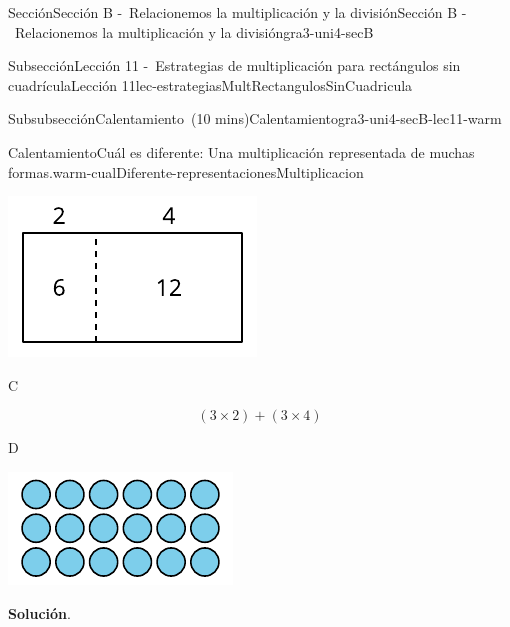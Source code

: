 \documentclass[oneside,10pt,]{article}
\newcommand{\blocktitlefont}{\relax}
\begin{document}
\begin{sectionptx}{Sección}{Sección B -~Relacionemos la multiplicación y la división}{}{Sección B -~Relacionemos la multiplicación y la división}{}{}{gra3-uni4-secB}
\begin{subsectionptx}{Subsección}{Lección 11 -~Estrategias de multiplicación para rectángulos sin cuadrícula}{}{Lección 11}{}{}{lec-estrategiasMultRectangulosSinCuadricula}
\begin{subsubsectionptx}{Subsubsección}{Calentamiento~(10 mins)}{}{Calentamiento}{}{}{gra3-uni4-secB-lec11-warm}
\begin{exploration}{Calentamiento}{Cuál es diferente: Una multiplicación representada de muchas formas.}{warm-cualDiferente-representacionesMultiplicacion}
\begin{sidebyside}{2}{0.05}{0.05}{0.1}
\begin{sbspanel}{0.4}
\includegraphics[width=\linewidth]{external/svg-source/tikz-file-153082-scale13.pdf}
\end{sbspanel}%
\end{sidebyside}%
\begin{sidebyside}{2}{0.05}{0.05}{0.1}%
\begin{sbspanel}{0.4}%
C%
\par
%
\begin{equation*}
(3\times 2) + (3\times 4)
\end{equation*}
%
\end{sbspanel}%
\begin{sbspanel}{0.4}%
D%
\par
\includegraphics[width=\linewidth]{external/svg-source/tikz-file-153083.pdf}
\end{sbspanel}%
\end{sidebyside}%
\par\smallskip%
\noindent\textbf{\blocktitlefont Solución}.\hypertarget{warm-cualDiferente-representacionesMultiplicacion-3}{}\quad{}%
\begin{itemize}[label=\textbullet]

\end{itemize}
\end{exploration}
\end{subsubsectionptx}
\end{subsectionptx}
\end{sectionptx}
\end{document}
